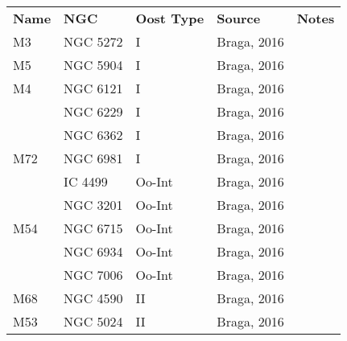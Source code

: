 \documentclass[]{article}
\begin{document}
\newpage

\begin{longtable}{
	p{1.5cm}|
	p{2.5cm}|
	p{2.5cm}|
	p{3.7cm}|
	p{5.5cm}
	@{}}
		\textbf{Name}           & \textbf{NGC}          & \textbf{Oost Type}  & \textbf{Source}               & \textbf{Notes}                                                                  \vspace{12pt}\\
		M3             & NGC 5272     & I          & Braga, 2016 \cite{braga_2016}         &                                                                        \\
		M5             & NGC 5904     & I          & Braga, 2016          &                                                                        \\
		M4             & NGC 6121     & I          & Braga, 2016          &                                                                        \\
		& NGC 6229     & I          & Braga, 2016          &                                                                        \\
		& NGC 6362     & I          & Braga, 2016          &                                                                        \\
		M72            & NGC 6981     & I          & Braga, 2016          &                                                                        \\
		& IC 4499      & Oo-Int     & Braga, 2016          &                                                                        \\
		& NGC 3201     & Oo-Int     & Braga, 2016          &                                                                        \\
		M54            & NGC 6715     & Oo-Int     & Braga, 2016          &                                                                        \\
		& NGC 6934     & Oo-Int     & Braga, 2016          &                                                                        \\
		& NGC 7006     & Oo-Int     & Braga, 2016          &                                                                        \\
		M68            & NGC 4590     & II         & Braga, 2016          &                                                                        \\
		M53            & NGC 5024     & II         & Braga, 2016          &                                                                        \\

\end{longtable}
\end{document}
